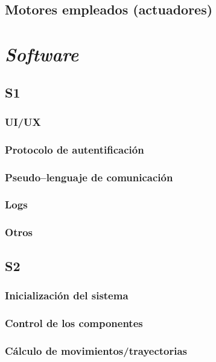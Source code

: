 \section{Motores empleados (actuadores)}


\chapter{\textit{Software}}
\label{chap:software}

\section{S1}

\subsection{UI/UX}

\subsection{Protocolo de autentificación}

\subsection{Pseudo--lenguaje de comunicación}

\subsection{Logs}

\subsection{Otros}

\section{S2}

\subsection{Inicialización del sistema}

\subsection{Control de los componentes}

\subsection{Cálculo de movimientos/trayectorias}

